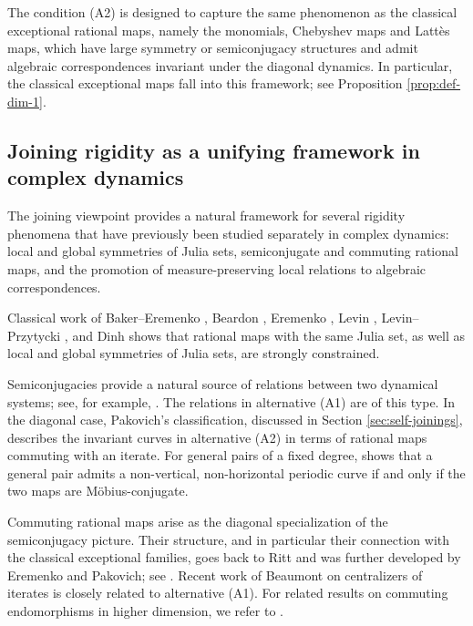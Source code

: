 \documentclass[11pt]{amsart}
\numberwithin{equation}{section}
\theoremstyle{plain}
\theoremstyle{definition}
\theoremstyle{remark}
\begin{document}
The condition
\textup{(A2)} is designed to capture the same phenomenon as the classical
exceptional rational maps, namely the monomials, Chebyshev maps and
Latt\`es maps, which have large symmetry or semiconjugacy structures
and admit algebraic correspondences invariant under the diagonal
dynamics. In particular, the classical exceptional maps fall into
this framework; see Proposition \ref{prop:def-dim-1}.


\subsection{Joining rigidity as a unifying framework in complex dynamics}
The joining viewpoint provides a natural framework for several
rigidity phenomena that have previously been studied separately in
complex dynamics: local and global symmetries of Julia sets,
semiconjugate and
commuting rational maps, and the promotion of
measure-preserving local relations to algebraic correspondences.

Classical work of Baker--Eremenko \cite{BakerEremenko1987}, Beardon
\cite{Beardon1992}, Eremenko \cite{EremenkoCommuting}, Levin
\cite{Levin1990}, Levin--Przytycki
\cite{LevinPrzytycki1997}, and Dinh \cite{Din00}
shows that rational maps with the same Julia set, as well as local and
global symmetries of Julia sets, are strongly constrained. 

Semiconjugacies provide a natural source of relations between two
dynamical systems; see, for example,
\cite{PakovichSemiconjugate}. The relations in alternative
\textup{(A1)} are of this type.
In the
diagonal case, Pakovich's classification, discussed in Section
\ref{sec:self-joinings}, describes the invariant curves in
alternative \textup{(A2)} in terms of rational maps commuting with an
iterate. For general pairs of a fixed degree,
\cite{PakovichPeriodicCurves} shows that a general pair admits a
non-vertical, non-horizontal periodic curve if and only if the two
maps are Möbius-conjugate.

Commuting rational maps arise as the diagonal specialization of the
semiconjugacy picture. Their structure, and in particular their
connection with the classical exceptional families, goes back to Ritt
\cite{RittPermutable}
and was further developed by Eremenko and Pakovich; see
\cite{EremenkoCommuting,PakovichCommuting}.
Recent work of Beaumont \cite{Bea25} on centralizers of iterates is
closely related to alternative \textup{(A1)}.
For related results on commuting endomorphisms in higher dimension, we refer to \cite{DinhCommutingC2,DinhSibonyCommutingPk,Kau18}.
\end{document}
